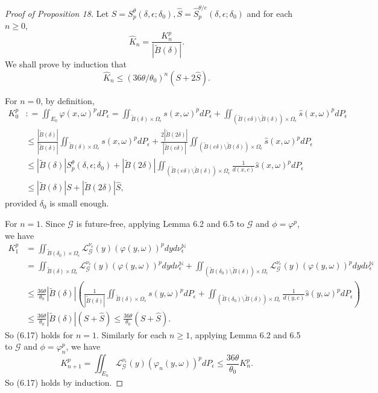 \documentclass[11pt,oneside]{article}
\theoremstyle{plain}
\numberwithin{equation}{section}
\numberwithin{figure}{section}
\numberwithin{table}{section}
\begin{document}
\begin{proof}[Proof of Proposition 18]


Let $S = S_p^{\theta}(\delta, \epsilon; \delta_0), \hat S = \hat S_p^{\theta/e} (\delta, \epsilon; \delta_0)$ and for each $n \geq 0$,
\[
\hat K_n = \frac{K_n^p}{|\tilde B(\delta)|}.
\]
We shall prove by induction that
\begin{equation}
\hat K_n \leq (36 \theta/\theta_0)^n (S+ 2 \hat S). 
\end{equation}

For $n=0$, by definition, 
\begin{align*}
K_0^p &: = \iint_{E_0} \varphi(x, \omega)^p d P_{\epsilon} = \iint_{\tilde B(\delta) \times \Omega_{\epsilon}} s(x, \omega)^p dP_{\epsilon} + \iint_{( \tilde B(e \delta) \setminus \tilde B(\delta)) \times \Omega_{\epsilon}} \hat s(x, \omega)^p dP_{\epsilon} \\
& \leq \frac{|\tilde B(\delta)|}{|\tilde B(\delta)|} \iint_{\tilde B(\delta) \times \Omega_{\epsilon}} s(x, \omega)^p dP_{\epsilon} + \frac{2|\tilde B(2\delta)|}{|\tilde B(e\delta)|}  \iint_{( \tilde B(e \delta) \setminus \tilde B(\delta)) \times \Omega_{\epsilon}} \hat s(x, \omega)^p dP_{\epsilon} \\
& \leq |\tilde B(\delta)| S_p^{\theta} (\delta, \epsilon; \delta_0) + |\tilde B(2\delta)|  \iint_{( \tilde B(e \delta) \setminus \tilde B(\delta)) \times \Omega_{\epsilon}} \frac{1}{d(x, c)} \hat s(x, \omega)^p dP_{\epsilon}\\
& \leq |\tilde B(\delta)| S + |\tilde B(2 \delta)| \hat S,
\end{align*}
provided $\delta_0$ is small enough. 


For $n=1$. Since $\mathscr G$ is future-free, applying Lemma 6.2 and 6.5 to $\mathscr G$ and $\phi = \varphi^p$, we have
\begin{align*}
K_1^p & = \iint_{\tilde B(\delta_0) \times \Omega_{\epsilon}} \mathcal L_{\mathscr G}^{\nu_{\epsilon}} (y) (\varphi(y, \omega))^p dy d \nu_{\epsilon}^{\mathbb N} \\
& =  \iint_{\tilde B(\delta) \times \Omega_{\epsilon}} \mathcal L_{\mathscr G}^{\nu_{\epsilon}} (y) (\varphi(y, \omega))^p dy d \nu_{\epsilon}^{\mathbb N} +  \iint_{ (\tilde B(\delta_0) \setminus \tilde B(\delta)) \times \Omega_{\epsilon}} \mathcal L_{\mathscr G}^{\nu_{\epsilon}} (y) (\varphi(y, \omega))^p dy d \nu_{\epsilon}^{\mathbb N} \\
& \leq \frac{36\theta}{\theta_0} |\tilde B(\delta)| \left( \frac{1}{|\tilde B(\delta)|} \iint_{\tilde B(\delta) \times \Omega_{\epsilon}}  s(y, \omega)^p dP_{\epsilon} + \iint_{ (\tilde B(\delta_0) \setminus \tilde B(\delta)) \times \Omega_{\epsilon}} \frac{1}{d(y, c)} \hat s(y, \omega)^p  d P_{\epsilon}\right) \\
& \leq \frac{36 \theta}{\theta_0} |\tilde B(\delta)| (S +  \hat S) \leq \frac{36 \theta}{\theta_0} (S +  \hat S).
\end{align*}
So (6.17) holds for $n =1$. Similarly for each $n \geq 1$, applying Lemma 6.2 and 6.5 to $\mathscr G$ and $\phi = \varphi_n^p$, we have
\[
K_{n+1}^p = \iint_{E_n} \mathcal L_{\mathscr G}^{\nu_{\epsilon}} (y) (\varphi_n(y, \omega))^p d P_{\epsilon} \leq \frac{36 \theta}{\theta_0} K_n^p.
\]
So (6.17) holds by induction.



\end{proof}
\end{document}
